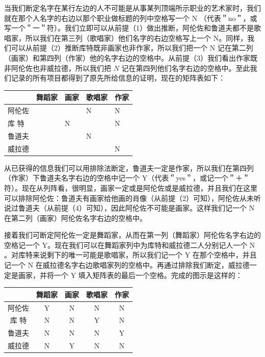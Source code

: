 当我们断定名字在某行左边的人不可能是从事某列顶端所示职业的艺术家时，我们就在那个人名字的右边以那个职业做标题的列中空格写一个 N （代表＂no＂，或写一个＂一＂符）。我们立即可以从前提（1）做出推断，阿伦佐和鲁道夫都不是歌唱家，所以我们在第三列（歌唱家）他们名字的右边空格写上一个 N。同样，我们可以从前提（2）推断库特既非画家也非作家，所以我们把一个 N 记在第二列（画家）和第四列（作家）他的名字右边的空格中。从前提（3）我们看出作家既非阿伦佐也非威拉德，所以我们把 $N$ 记在第四列他们名字右边的空格中。至此我们记录的所有项目都得到了原先所给信息的证明，现在的矩阵表如下：

\begin{center}
\begin{tabular}{|l|l|l|l|l|}
\hline
 & 舞蹈家 & 画家 & 歌唱家 & 作家 \\
\hline
阿伦佐 &  &  & N & N \\
\hline
库 特 &  & N &  & N \\
\hline
鲁道夫 &  &  & N &  \\
\hline
威拉德 &  &  &  & N \\
\hline
\end{tabular}
\end{center}

从已获得的信息我们可以用排除法断定，鲁道夫一定是作家，所以我们在第四列（作家）下鲁道夫名字右边的空格中记一个 Y（代表＂yes＂，或记一个＂＋＂符）。现在从列阵看，很明显，画家一定或是阿伦佐或是威拉德，并且我们在这里可以排除阿伦佐：鲁道夫有画家给他画的肖像（从前提（2）可知），阿伦佐从未听说过鲁道夫（从前提（4）可知），因此阿伦佐不可能是画家。这样我们记一个 N 在第二列（画家）阿伦佐名字右边的空格中。

接着我们可断定阿伦佐一定是舞蹈家，从而在第一列（舞蹈家）阿伦佐名字右边的空格记一个 Y。现在我们可以在舞蹈家列中为库特和威拉德二人分别记人一个 N 。对库特来说剩下的唯一可能是歌唱家，所以我们记一个 Y 在那个空格中，并且记一个 N 在威拉德名字右边歌唱家列的空格中。再通过排除我们断定，威拉德一定是画家，并将一个 Y 填入矩阵表的最后一个空格。完成的图示是这样的：

\begin{center}
\begin{tabular}{|c|c|c|c|c|}
\hline
 & 舞蹈家 & 画家 & 歌唱家 & 作家 \\
\hline
阿伦佐 & Y & N & N & N \\
\hline
库 特 & N & N & Y & N \\
\hline
鲁道夫 & N & N & N & Y \\
\hline
威拉德 & N & Y & N & N \\
\hline
\end{tabular}
\end{center}

